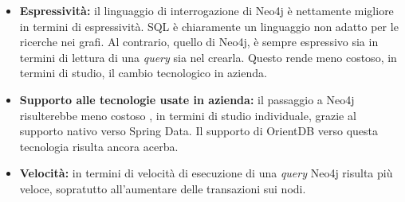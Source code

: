 \begin{itemize}
\item{\textbf{Espressività:}} il linguaggio di interrogazione di Neo4j è nettamente migliore in termini di espressività. SQL è chiaramente un linguaggio non adatto per le ricerche nei grafi. Al contrario, quello di Neo4j, è sempre espressivo sia in termini di lettura di una \textit{query} sia nel crearla. Questo rende meno costoso, in termini di studio, il cambio tecnologico in azienda. 
\item{\textbf{Supporto alle tecnologie usate in azienda:}} il passaggio a Neo4j risulterebbe meno costoso , in termini di studio individuale, grazie al supporto nativo verso Spring Data. Il supporto di OrientDB verso questa tecnologia risulta ancora acerba.

\item{\textbf{Velocità:}} in termini di velocità di esecuzione di una \textit{query} Neo4j risulta più veloce, sopratutto all'aumentare delle transazioni sui nodi.
\end{itemize}















